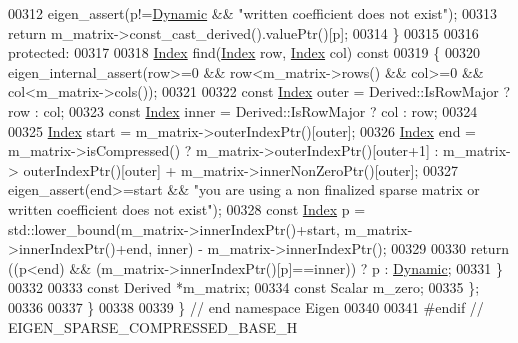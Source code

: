 \begin{DoxyCode}
00312     eigen\_assert(p!=\hyperlink{namespace_eigen_ad81fa7195215a0ce30017dfac309f0b2}{Dynamic} && \textcolor{stringliteral}{"written coefficient does not exist"});
00313     \textcolor{keywordflow}{return} m\_matrix->const\_cast\_derived().valuePtr()[p];
00314   \}
00315 
00316 \textcolor{keyword}{protected}:
00317 
00318   \hyperlink{group___core___module_a554f30542cc2316add4b1ea0a492ff02}{Index} find(\hyperlink{group___core___module_a554f30542cc2316add4b1ea0a492ff02}{Index} row, \hyperlink{group___core___module_a554f30542cc2316add4b1ea0a492ff02}{Index} col)\textcolor{keyword}{ const}
00319 \textcolor{keyword}{  }\{
00320     eigen\_internal\_assert(row>=0 && row<m\_matrix->rows() && col>=0 && col<m\_matrix->cols());
00321 
00322     \textcolor{keyword}{const} \hyperlink{group___core___module_a554f30542cc2316add4b1ea0a492ff02}{Index} outer = Derived::IsRowMajor ? row : col;
00323     \textcolor{keyword}{const} \hyperlink{group___core___module_a554f30542cc2316add4b1ea0a492ff02}{Index} inner = Derived::IsRowMajor ? col : row;
00324 
00325     \hyperlink{group___core___module_a554f30542cc2316add4b1ea0a492ff02}{Index} start = m\_matrix->outerIndexPtr()[outer];
00326     \hyperlink{group___core___module_a554f30542cc2316add4b1ea0a492ff02}{Index} end = m\_matrix->isCompressed() ? m\_matrix->outerIndexPtr()[outer+1] : m\_matrix->
      outerIndexPtr()[outer] + m\_matrix->innerNonZeroPtr()[outer];
00327     eigen\_assert(end>=start && \textcolor{stringliteral}{"you are using a non finalized sparse matrix or written coefficient does not
       exist"});
00328     \textcolor{keyword}{const} \hyperlink{group___core___module_a554f30542cc2316add4b1ea0a492ff02}{Index} p = std::lower\_bound(m\_matrix->innerIndexPtr()+start, m\_matrix->innerIndexPtr()+end,
      inner) - m\_matrix->innerIndexPtr();
00329 
00330     \textcolor{keywordflow}{return} ((p<end) && (m\_matrix->innerIndexPtr()[p]==inner)) ? p : \hyperlink{namespace_eigen_ad81fa7195215a0ce30017dfac309f0b2}{Dynamic};
00331   \}
00332 
00333   \textcolor{keyword}{const} Derived *m\_matrix;
00334   \textcolor{keyword}{const} Scalar m\_zero;
00335 \};
00336 
00337 \}
00338 
00339 \} \textcolor{comment}{// end namespace Eigen}
00340 
00341 \textcolor{preprocessor}{#endif // EIGEN\_SPARSE\_COMPRESSED\_BASE\_H}
\end{DoxyCode}
